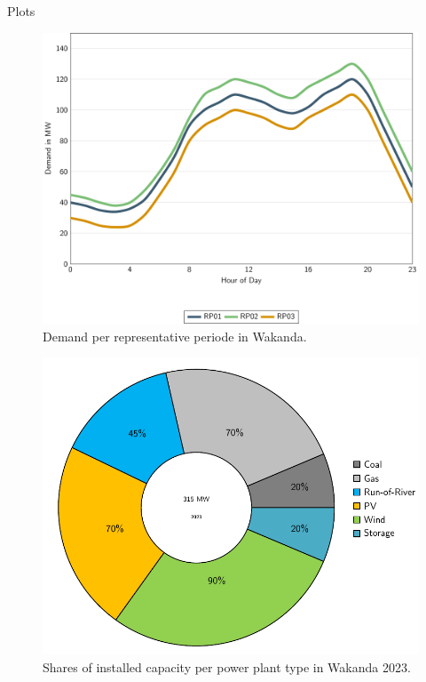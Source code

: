 \documentclass[aspectratio=169]{beamer}
\begin{document}
\begin{frame}{Plots}
\begin{minipage}[t]{0.49\textwidth}
\begin{overprint}
        \begin{figure}[htbp]
             \includegraphics[width=\linewidth]{figures/demand_rp.pdf}  %
            \caption{\centering Demand per representative periode in Wakanda.}
            \label{fig:demand}
        \end{figure}
 
        \begin{figure}[htbp]
            \includegraphics[width=\linewidth]
            {figures/installed_capacity_2023_percent.pdf}  %
            \caption{\centering Shares of installed capacity per power plant type in Wakanda 2023.}
            \label{fig:installed_capacity_2023}
        \end{figure}
        \end{overprint}
    \end{minipage}

\end{frame}
\end{document}
